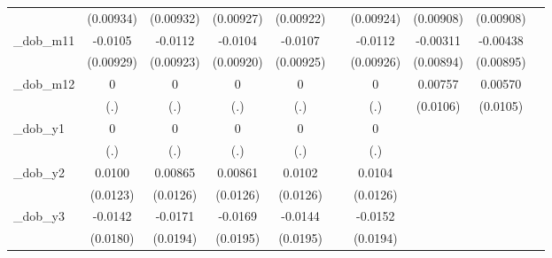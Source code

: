 \begin{table}[htbp]
\begin{tabular}{l*{9}{c}}
            &   (0.00934)         &   (0.00932)         &   (0.00927)         &   (0.00922)         &                     &   (0.00924)         &   (0.00908)         &   (0.00908)         &                     \\
[1em]
\_dob\_m11    &     -0.0105         &     -0.0112         &     -0.0104         &     -0.0107         &                     &     -0.0112         &    -0.00311         &    -0.00438         &                     \\
            &   (0.00929)         &   (0.00923)         &   (0.00920)         &   (0.00925)         &                     &   (0.00926)         &   (0.00894)         &   (0.00895)         &                     \\
[1em]
\_dob\_m12    &           0         &           0         &           0         &           0         &                     &           0         &     0.00757         &     0.00570         &                     \\
            &         (.)         &         (.)         &         (.)         &         (.)         &                     &         (.)         &    (0.0106)         &    (0.0105)         &                     \\
[1em]
\_dob\_y1     &           0         &           0         &           0         &           0         &                     &           0         &                     &                     &                     \\
            &         (.)         &         (.)         &         (.)         &         (.)         &                     &         (.)         &                     &                     &                     \\
[1em]
\_dob\_y2     &      0.0100         &     0.00865         &     0.00861         &      0.0102         &                     &      0.0104         &                     &                     &                     \\
            &    (0.0123)         &    (0.0126)         &    (0.0126)         &    (0.0126)         &                     &    (0.0126)         &                     &                     &                     \\
[1em]
\_dob\_y3     &     -0.0142         &     -0.0171         &     -0.0169         &     -0.0144         &                     &     -0.0152         &                     &                     &                     \\
            &    (0.0180)         &    (0.0194)         &    (0.0195)         &    (0.0195)         &                     &    (0.0194)         &                     &                     &                     \\

\end{tabular}
\end{table}

